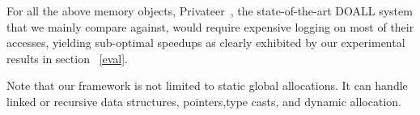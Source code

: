 For all the above memory objects, Privateer~\cite{}, the state-of-the-art DOALL
system that we mainly compare against, would require expensive logging on most
of their accesses,
yielding sub-optimal speedups as clearly exhibited by our experimental results
in section ~\ref{eval}.

Note that our framework is not limited to static global allocations.  It can
handle linked or recursive data structures, pointers,type  casts,  and  dynamic
allocation.






%      
%      
%
%
%
%
%      
%      
%      
%      


